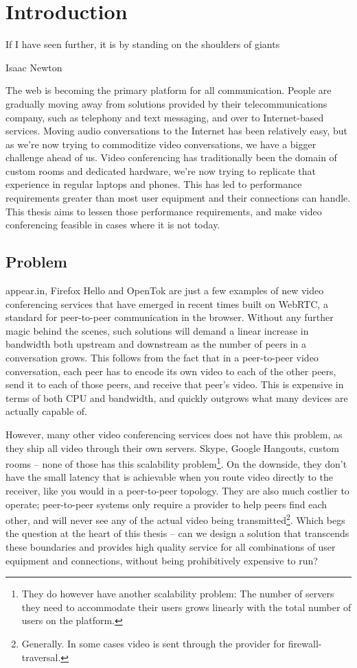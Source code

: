 \chapter{Introduction}\label{chp:introduction}

\epigraph{If I have seen further, it is by standing on the shoulders of giants}{Isaac Newton}

The web is becoming the primary platform for all communication. People are gradually moving away from solutions provided by their telecommunications company, such as telephony and text messaging, and over to Internet-based services. Moving audio conversations to the Internet has been relatively easy, but as we're now trying to commoditize video conversations, we have a bigger challenge ahead of us. Video conferencing has traditionally been the domain of custom rooms and dedicated hardware, we're now trying to replicate that experience in regular laptops and phones. This has led to performance requirements greater than most user equipment and their connections can handle. This thesis aims to lessen those performance requirements, and make video conferencing feasible in cases where it is not today.


\section{Problem}

appear.in, Firefox Hello and OpenTok are just a few examples of new video conferencing services that have emerged in recent times built on WebRTC, a standard for peer-to-peer communication in the browser. Without any further magic behind the scenes, such solutions will demand a linear increase in bandwidth both upstream and downstream as the number of peers in a conversation grows. This follows from the fact that in a peer-to-peer video conversation, each peer has to encode its own video to each of the other peers, send it to each of those peers, and receive that peer's video. This is expensive in terms of both CPU and bandwidth, and quickly outgrows what many devices are actually capable of.

However, many other video conferencing services does not have this problem, as they ship all video through their own servers. Skype, Google Hangouts, custom rooms -- none of those has this scalability problem\footnote{They do however have another scalability problem: The number of servers they need to accommodate their users grows linearly with the total number of users on the platform.}. On the downside, they don't have the small latency that is achievable when you route video directly to the receiver, like you would in a peer-to-peer topology. They are also much costlier to operate; peer-to-peer systems only require a provider to help peers find each other, and will never see any of the actual video being transmitted\footnote{Generally. In some cases video is sent through the provider for firewall-traversal.}. Which begs the question at the heart of this thesis -- can we design a solution that transcends these boundaries and provides high quality service for all combinations of user equipment and connections, without being prohibitively expensive to run?

